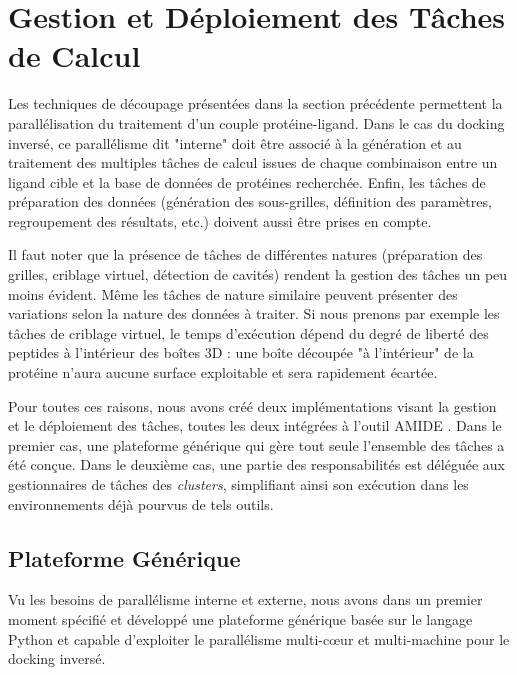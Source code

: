 \section{Gestion et Déploiement des Tâches de Calcul}

Les techniques de découpage présentées dans la section précédente permettent la parallélisation du traitement d'un couple protéine-ligand. Dans le cas du docking inversé, ce parallélisme dit "interne" doit être associé à la génération et au traitement des multiples tâches de calcul issues de chaque combinaison entre un ligand cible et la base de données de protéines recherchée. Enfin, les tâches de préparation des données (génération des sous-grilles, définition des paramètres, regroupement des résultats, etc.) doivent aussi être prises en compte. 

Il faut noter que la présence de tâches de différentes natures (préparation des grilles, criblage virtuel, détection de cavités) rendent la gestion des tâches un peu moins évident. Même les tâches de nature similaire peuvent présenter des variations selon la nature des données à traiter. Si nous prenons par exemple les tâches de criblage virtuel, le temps d'exécution dépend du degré de liberté des peptides à l'intérieur des boîtes 3D : une boîte découpée "à l'intérieur" de la protéine n'aura aucune surface exploitable et sera rapidement écartée.    

Pour toutes ces raisons, nous avons créé deux implémentations visant la gestion et le déploiement des tâches, toutes les deux intégrées à l'outil AMIDE \cite{Vasseur2015}. Dans le premier cas, une plateforme générique qui gère tout seule l'ensemble des tâches a été conçue. Dans le deuxième cas, une partie des responsabilités est déléguée aux gestionnaires de tâches des \textit{clusters}, simplifiant ainsi son exécution dans les environnements déjà pourvus de tels outils.

\subsection{Plateforme Générique}

Vu les besoins de parallélisme interne et externe, nous avons dans un premier moment spécifié et développé une plateforme générique basée sur le langage Python et capable d'exploiter le parallélisme multi-c{\oe}ur et multi-machine pour le docking inversé. 

